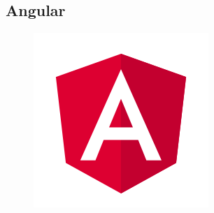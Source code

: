 \subsection{Angular}



\begin{figure}[!h]
    \centering
    \includegraphics[width=0.4\linewidth]{images/tecnologias/angular.png}
\end{figure}